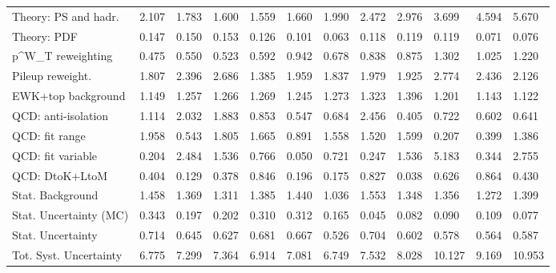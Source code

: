 \begin{tabular}{l|p{0.6cm}p{0.6cm}p{0.6cm}p{0.6cm}p{0.6cm}p{0.6cm}p{0.6cm}p{0.6cm}p{0.6cm}p{0.6cm}p{0.6cm}}
Theory: PS and hadr.                     & 2.107 & 1.783 & 1.600 & 1.559 & 1.660 & 1.990 & 2.472 & 2.976 & 3.699 & 4.594 & 5.670 \\
Theory: PDF                              & 0.147 & 0.150 & 0.153 & 0.126 & 0.101 & 0.063 & 0.118 & 0.119 & 0.119 & 0.071 & 0.076 \\
p^{W}_{T} reweighting                    & 0.475 & 0.550 & 0.523 & 0.592 & 0.942 & 0.678 & 0.838 & 0.875 & 1.302 & 1.025 & 1.220 \\
Pileup reweight.                         & 1.807 & 2.396 & 2.686 & 1.385 & 1.959 & 1.837 & 1.979 & 1.925 & 2.774 & 2.436 & 2.126 \\
EWK+top background                       & 1.149 & 1.257 & 1.266 & 1.269 & 1.245 & 1.273 & 1.323 & 1.396 & 1.201 & 1.143 & 1.122 \\
QCD: anti-isolation                      & 1.114 & 2.032 & 1.883 & 0.853 & 0.547 & 0.684 & 2.456 & 0.405 & 0.722 & 0.602 & 0.641 \\
QCD: fit range                           & 1.958 & 0.543 & 1.805 & 1.665 & 0.891 & 1.558 & 1.520 & 1.599 & 0.207 & 0.399 & 1.386 \\
QCD: fit variable                        & 0.204 & 2.484 & 1.536 & 0.766 & 0.050 & 0.721 & 0.247 & 1.536 & 5.183 & 0.344 & 2.755 \\
QCD: DtoK+LtoM                           & 0.404 & 0.129 & 0.378 & 0.846 & 0.196 & 0.175 & 0.827 & 0.038 & 0.626 & 0.864 & 0.430 \\
Stat. Background                         & 1.458 & 1.369 & 1.311 & 1.385 & 1.440 & 1.036 & 1.553 & 1.348 & 1.356 & 1.272 & 1.399 \\
Stat. Uncertainty (MC)                   & 0.343 & 0.197 & 0.202 & 0.310 & 0.312 & 0.165 & 0.045 & 0.082 & 0.090 & 0.109 & 0.077 \\
\hline
Stat. Uncertainty                        & 0.714 & 0.645 & 0.627 & 0.681 & 0.667 & 0.526 & 0.704 & 0.602 & 0.578 & 0.564 & 0.587 \\
\hline
Tot. Syst. Uncertainty                   & 6.775 & 7.299 & 7.364 & 6.914 & 7.081 & 6.749 & 7.532 & 8.028 & 10.127 & 9.169 & 10.953 \\
\hline
\end{tabular}
